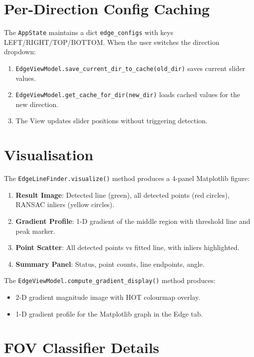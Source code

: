 \documentclass[11pt,a4paper]{article}
\begin{document}
\section{Per-Direction Config Caching}

The \texttt{AppState} maintains a dict \texttt{edge\_configs} with keys LEFT/RIGHT/TOP/BOTTOM. When the user switches the direction dropdown:
\begin{enumerate}
\item \texttt{EdgeViewModel.save\_current\_dir\_to\_cache(old\_dir)} saves current slider values.
\item \texttt{EdgeViewModel.get\_cache\_for\_dir(new\_dir)} loads cached values for the new direction.
\item The View updates slider positions without triggering detection.
\end{enumerate}

\section{Visualisation}

The \texttt{EdgeLineFinder.visualize()} method produces a 4-panel Matplotlib figure:
\begin{enumerate}
\item \textbf{Result Image}: Detected line (green), all detected points (red circles), RANSAC inliers (yellow circles).
\item \textbf{Gradient Profile}: 1-D gradient of the middle region with threshold line and peak marker.
\item \textbf{Point Scatter}: All detected points vs fitted line, with inliers highlighted.
\item \textbf{Summary Panel}: Status, point counts, line endpoints, angle.
\end{enumerate}

The \texttt{EdgeViewModel.compute\_gradient\_display()} method produces:
\begin{itemize}
\item 2-D gradient magnitude image with HOT colourmap overlay.
\item 1-D gradient profile for the Matplotlib graph in the Edge tab.
\end{itemize}

\section{FOV Classifier Details}
\end{document}
